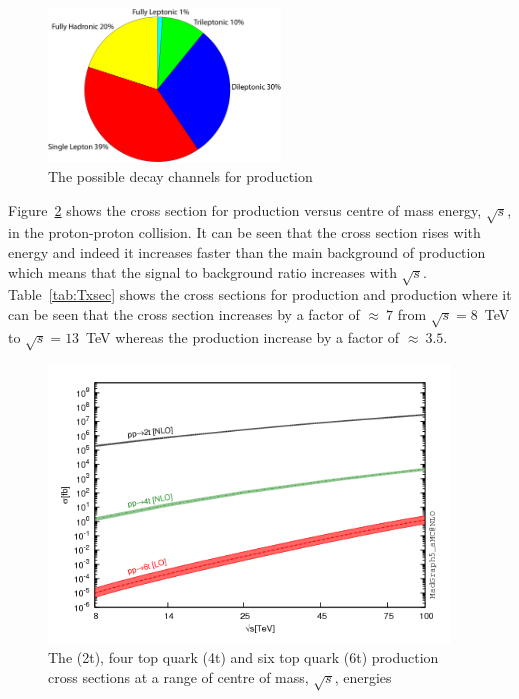 \begin{figure}[ht!]
\centering
    \includegraphics[width=0.55\textwidth]{images/Analysis/FourTopBR.pdf}
    \caption{The possible decay channels for \tttt production}
    \label{fig:ttttDecay}
\end{figure}

Figure~\ref{fig:tttt100tev} shows the cross section for \tttt production versus centre of mass energy, $\sqrt{s}$, in the proton-proton collision. It can be seen that the cross section rises with energy and indeed it increases faster than the main background of \ttbar production which means that the signal to background ratio increases with $\sqrt{s}$. Table~\ref{tab:Txsec} shows the cross sections for \tttt production and \ttbar production where it can be seen that the \tttt cross section increases by a factor of $\approx~7$ from $\sqrt{s} = 8$~TeV to $\sqrt{s} = 13$~TeV whereas the \ttbar production increase by a factor of $\approx~3.5$.

\begin{figure}[ht!]
\begin{center}
    \includegraphics[width=0.95\textwidth]{images/Theory/100TeV.png}
    \caption{The \ttbar (2t), four top quark (4t) and six top quark (6t) production cross sections at a range of centre of mass, $\sqrt{s}$, energies~\cite{Deandrea:2014raa}}
    \label{fig:tttt100tev}
\end{center}
\end{figure}

